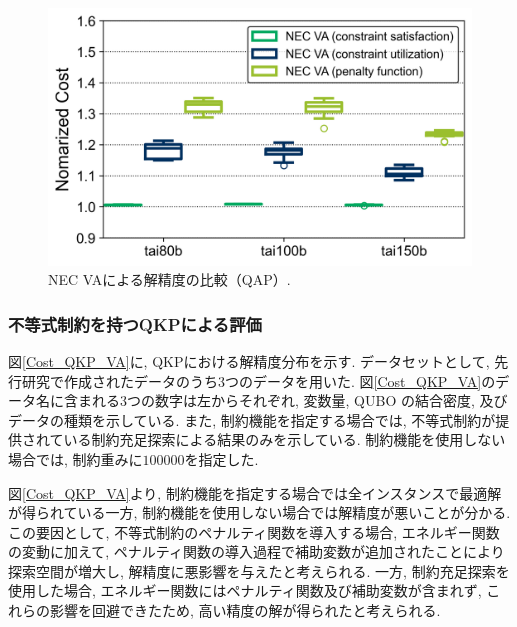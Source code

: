 \documentclass[submit,techrep,noauthor]{ipsj}
\begin{document}
\begin{figure}[tb]
\centering
\includegraphics[bb=0 0 700 230, width=15cm]{Cost_QAP_VA.png}
\caption{NEC VAによる解精度の比較（QAP）.}
\label{Cost_QAP_VA}
\end{figure}

\subsubsection{不等式制約を持つQKPによる評価}
図\ref{Cost_QKP_VA}に, QKPにおける解精度分布を示す. データセットとして, 先行研究で作成されたデータ\cite{qkplib}のうち3つのデータを用いた. 図\ref{Cost_QKP_VA}のデータ名に含まれる3つの数字は左からそれぞれ, 変数量, QUBO の結合密度, 及びデータの種類を示している. また, 制約機能を指定する場合では, 不等式制約が提供されている制約充足探索による結果のみを示している. 制約機能を使用しない場合では, 制約重みに$100000$を指定した.

図\ref{Cost_QKP_VA}より, 制約機能を指定する場合では全インスタンスで最適解が得られている一方, 制約機能を使用しない場合では解精度が悪いことが分かる. この要因として, 不等式制約のペナルティ関数を導入する場合, エネルギー関数の変動に加えて, ペナルティ関数の導入過程で補助変数が追加されたことにより探索空間が増大し, 解精度に悪影響を与えたと考えられる. 一方, 制約充足探索を使用した場合, エネルギー関数にはペナルティ関数及び補助変数が含まれず, これらの影響を回避できたため, 高い精度の解が得られたと考えられる.
\end{document}
